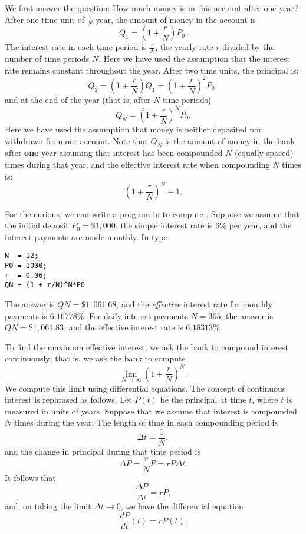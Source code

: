 \documentclass{ximera}
\begin{document}
We first answer the question: How much money is in this account after
one year?  After one time unit of $\frac{1}{N}$ year, the amount of
money in the account is
\[
Q_1 = \left(1+\frac{r}{N}\right)P_0.
\]
The interest rate in each time period is $\frac{r}{N}$,
the yearly rate $r$ divided by the number of time periods $N$.  Here
we have used the assumption that the interest rate remains constant
throughout the year.  After two time units, the principal is:
\[
Q_2 = \left(1+\frac{r}{N}\right)Q_1 = \left(1+\frac{r}{N}\right)^2P_0,
\]
and at the end of the year (that is, after $N$ time periods)
\begin{equation} \label{compint}
Q_N = \left(1+\frac{r}{N}\right)^N P_0.
\end{equation}
Here we have used the assumption that money is neither deposited nor
withdrawn from our account.   Note that $Q_N$ is the amount of money
in the bank after {\bf one} year assuming that interest has been
compounded $N$ (equally spaced) times during that year, and the effective
interest rate when compounding $N$ times is:
\[
\left(1+\frac{r}{N}\right)^N - 1.
\]

For the curious, we can write a program in \Matlab to compute
.  Suppose we assume that the initial deposit $P_0=\$1,000$,
the simple interest rate is $6\%$ per year, and the interest payments
are made monthly. In \Matlab type
\begin{verbatim}
N  = 12;
P0 = 1000;
r  = 0.06;
QN = (1 + r/N)^N*P0
\end{verbatim}
The answer is $QN=\$1,061.68$, and the {\em effective\/}
interest rate for monthly payments is $6.16778\%$.  For daily
interest payments $N=365$, the answer is $QN=\$1,061.83$, and
the effective interest rate is $6.18313\%$.

To find the maximum effective interest, we ask the bank to compound interest
continuously; that is, we ask the bank to compute
\[
\lim_{N\to\infty} \left(1 + \frac{r}{N}\right)^N.
\]
We compute this limit using differential equations.  The concept of
continuous interest is rephrased as follows.  Let $P(t)$ be the
principal at time $t$, where $t$ is measured in units of years.
Suppose that we assume that interest is compounded $N$ times during
the year.  The length of time in each compounding period is
\[
\Delta t = \frac{1}{N},
\]
and the change in principal during that time period is
\[
\Delta P = \frac{r}{N} P = rP\Delta t.
\]
It follows that
\[
\frac{\Delta P}{\Delta t} = rP,
\]
and, on taking the limit $\Delta t \to 0$, we have the differential equation
\[
\frac{dP}{dt}(t) = rP(t).
\]
\end{document}
